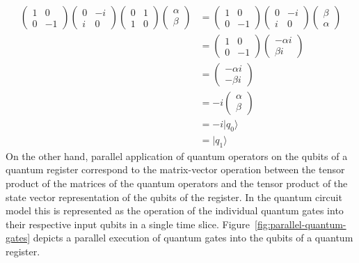\begin{align*}
\begin{pmatrix}
1 & 0\\
0 & -1
\end{pmatrix}
\begin{pmatrix}
0 & -i\\
i & 0
\end{pmatrix}
\begin{pmatrix}
0 & 1\\
1 & 0
\end{pmatrix}
\begin{pmatrix}
\alpha\\
\beta
\end{pmatrix}
&=
\begin{pmatrix}
1 & 0\\
0 & -1
\end{pmatrix}
\begin{pmatrix}
0 & -i\\
i & 0
\end{pmatrix}
\begin{pmatrix}
\beta\\
\alpha
\end{pmatrix}\\
&=
\begin{pmatrix}
1 & 0\\
0 & -1
\end{pmatrix}
\begin{pmatrix}
-\alpha i\\
\beta i
\end{pmatrix}\\
&=
\begin{pmatrix}
-\alpha i\\
-\beta i
\end{pmatrix}\\
&= -i
\begin{pmatrix}
\alpha\\
\beta
\end{pmatrix}\\
&= -i\vert q_0 \rangle\\
&= \vert q_1 \rangle
\end{align*}
On the other hand, parallel application of quantum operators on the qubits of a quantum register correspond to the matrix-vector operation between the tensor product of the matrices of the quantum operators and the tensor product of the state vector representation of the qubits of the register. In the quantum circuit model this is represented as the operation of the individual quantum gates into their respective input qubits in a single time slice. Figure~\ref{fig:parallel-quantum-gates} depicts a parallel execution of quantum gates into the qubits of a quantum register.
